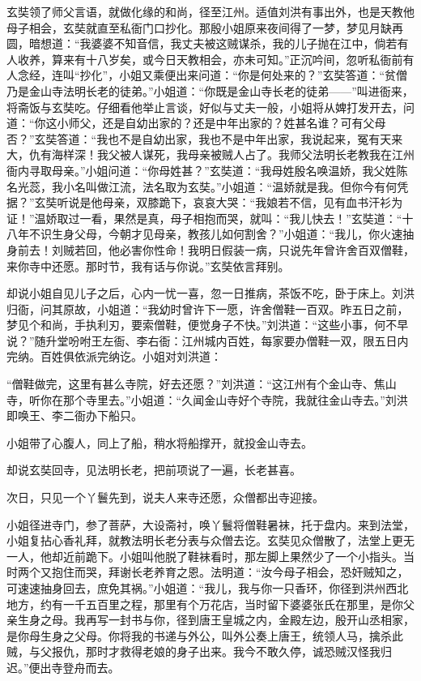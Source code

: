 \documentclass[12pt]{lsbook}
\begin{document}
玄奘领了师父言语，就做化缘的和尚，径至江州。适值刘洪有事出外，也是天教他母子相会，玄奘就直至私衙门口抄化。那殷小姐原来夜间得了一梦，梦见月缺再圆，暗想道：“我婆婆不知音信，我丈夫被这贼谋杀，我的儿子抛在江中，倘若有人收养，算来有十八岁矣，或今日天教相会，亦未可知。”正沉吟间，忽听私衙前有人念经，连叫“抄化”，小姐又乘便出来问道：“你是何处来的？”玄奘答道：“贫僧乃是金山寺法明长老的徒弟。”小姐道：“你既是金山寺长老的徒弟——”叫进衙来，将斋饭与玄奘吃。仔细看他举止言谈，好似与丈夫一般，小姐将从婢打发开去，问道：“你这小师父，还是自幼出家的？还是中年出家的？姓甚名谁？可有父母否？”玄奘答道：“我也不是自幼出家，我也不是中年出家，我说起来，冤有天来大，仇有海样深！我父被人谋死，我母亲被贼人占了。我师父法明长老教我在江州衙内寻取母亲。”小姐问道：“你母姓甚？”玄奘道：“我母姓殷名唤温娇，我父姓陈名光蕊，我小名叫做江流，法名取为玄奘。”小姐道：“温娇就是我。但你今有何凭据？”玄奘听说是他母亲，双膝跪下，哀哀大哭：“我娘若不信，见有血书汗衫为证！”温娇取过一看，果然是真，母子相抱而哭，就叫：“我儿快去！”玄奘道：“十八年不识生身父母，今朝才见母亲，教孩儿如何割舍？”小姐道：“我儿，你火速抽身前去！刘贼若回，他必害你性命！我明日假装一病，只说先年曾许舍百双僧鞋，来你寺中还愿。那时节，我有话与你说。”玄奘依言拜别。

却说小姐自见儿子之后，心内一忧一喜，忽一日推病，茶饭不吃，卧于床上。刘洪归衙，问其原故，小姐道：“我幼时曾许下一愿，许舍僧鞋一百双。昨五日之前，梦见个和尚，手执利刃，要索僧鞋，便觉身子不快。”刘洪道：“这些小事，何不早说？”随升堂吩咐王左衙、李右衙：江州城内百姓，每家要办僧鞋一双，限五日内完纳。百姓俱依派完纳讫。小姐对刘洪道：

“僧鞋做完，这里有甚么寺院，好去还愿？”刘洪道：“这江州有个金山寺、焦山寺，听你在那个寺里去。”小姐道：“久闻金山寺好个寺院，我就往金山寺去。”刘洪即唤王、李二衙办下船只。

小姐带了心腹人，同上了船，稍水将船撑开，就投金山寺去。

却说玄奘回寺，见法明长老，把前项说了一遍，长老甚喜。

次日，只见一个丫鬟先到，说夫人来寺还愿，众僧都出寺迎接。

小姐径进寺门，参了菩萨，大设斋衬，唤丫鬟将僧鞋暑袜，托于盘内。来到法堂，小姐复拈心香礼拜，就教法明长老分表与众僧去讫。玄奘见众僧散了，法堂上更无一人，他却近前跪下。小姐叫他脱了鞋袜看时，那左脚上果然少了一个小指头。当时两个又抱住而哭，拜谢长老养育之恩。法明道：“汝今母子相会，恐奸贼知之，可速速抽身回去，庶免其祸。”小姐道：“我儿，我与你一只香环，你径到洪州西北地方，约有一千五百里之程，那里有个万花店，当时留下婆婆张氏在那里，是你父亲生身之母。我再写一封书与你，径到唐王皇城之内，金殿左边，殷开山丞相家，是你母生身之父母。你将我的书递与外公，叫外公奏上唐王，统领人马，擒杀此贼，与父报仇，那时才救得老娘的身子出来。我今不敢久停，诚恐贼汉怪我归迟。”便出寺登舟而去。
\end{document}
